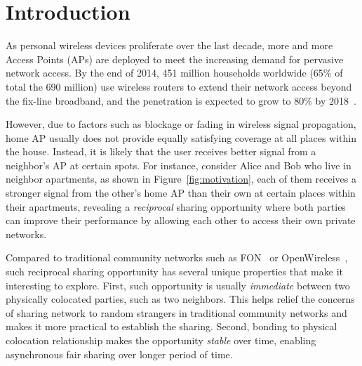 \section{Introduction}
\label{sec-introduction}

As personal wireless devices proliferate over the last decade, more and more
\wifi{} Access Points (APs) are deployed to meet the increasing demand for
pervasive network access. By the end of 2014, 451 million households worldwide
(65\% of total the 690 million) use wireless routers to extend their network access
beyond the fix-line broadband, and the penetration is expected to
grow to 80\% by 2018~\cite{survey}.

However, due to factors such as blockage or fading in wireless signal
propagation, home \wifi{} AP usually does not provide equally satisfying \wifi{}
coverage at all places within the house. Instead, it is likely that the user
receives better \wifi{} signal from a neighbor's AP at certain spots. For
instance, consider Alice and Bob who live in neighbor apartments, as shown in
Figure~\ref{fig:motivation}, each of them receives a stronger \wifi{} signal
from the other's home AP than their own at certain places within their
apartments, revealing a \textit{reciprocal} \wifi{} sharing opportunity where
both parties can improve their \wifi{} performance by allowing each other to
access their own private networks.

Compared to traditional community networks such as FON~\cite{fon} or
OpenWireless~\cite{openwireless}, such reciprocal sharing opportunity has
several unique properties that make it interesting to explore. First, such
opportunity is usually \textit{immediate} between two physically colocated
parties, such as two neighbors. This helps relief the concerns of sharing
network to random strangers in traditional community networks and makes it more
practical to establish the sharing. Second, bonding to physical colocation
relationship makes the opportunity \textit{stable} over time, enabling
asynchronous fair sharing over longer period of time.

